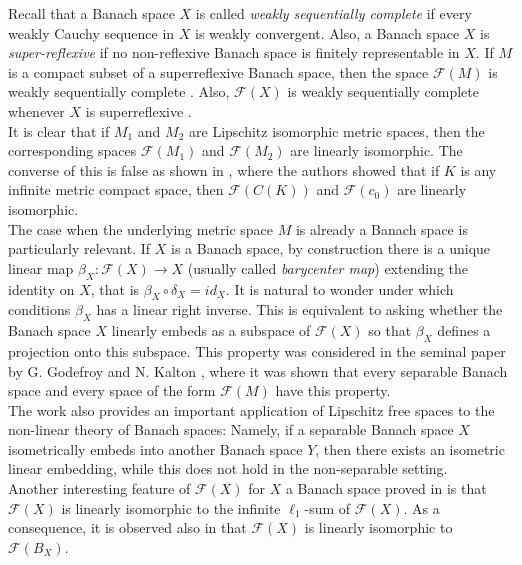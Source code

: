 \documentclass[12pt,leqno]{amsart}
\numberwithin{equation}{section} %
\theoremstyle{definition}
\numberwithin{equation}{section}
\begin{document}
Recall that a Banach space $X$ is called \textit{weakly sequentially complete} if every weakly Cauchy sequence in $X$ is weakly convergent. Also, a Banach space $X$ is \textit{super-reflexive} if no non-reflexive Banach space is finitely representable in $X$. If $M$ is a compact subset of a superreflexive Banach space, then the space $\mathcal F(M)$ is weakly sequentially complete \cite{KP}. Also, $\mathcal F(X)$ is weakly sequentially complete whenever $X$ is superreflexive \cite{APP21}. \\

It is clear that if $M_1$ and $M_2$ are Lipschitz isomorphic metric spaces, then the corresponding spaces $\mathcal F(M_1)$ and $\mathcal F(M_2)$ are linearly isomorphic. The converse of this is false as shown in \cite{DF}, where the authors showed that if $K$ is any infinite metric compact space, then $\mathcal F(C(K))$ and $\mathcal F(c_0)$ are linearly isomorphic.\\

The case when the underlying metric space $M$ is already a Banach space is particularly relevant. If $X$ is a Banach space, by construction there is a unique linear map $\beta_X:\mathcal F(X) \rightarrow X$ (usually called \emph{barycenter map}) extending the identity on $X$, that is $\beta_X \circ \delta_X=id_X$. It is natural to wonder under which conditions $\beta_X$ has a linear right inverse. This is equivalent to asking whether the Banach space $X$ linearly embeds as a subspace of $\mathcal F(X)$ so that $\beta_X$ defines a projection onto this subspace. This property was considered in the seminal paper by G. Godefroy and N. Kalton \cite{GK}, where it was shown that every separable Banach space and every space of the form $\mathcal F(M)$ have this property.\\

The work \cite{GK} also provides an important application of Lipschitz free spaces to the non-linear theory of Banach spaces: Namely, if a separable Banach space $X$ isometrically embeds into another Banach space $Y$, then there exists an isometric linear embedding, while this does
not hold in the non-separable setting.\\

Another interesting feature of $\mathcal F(X)$ for $X$ a Banach space proved in \cite{Kauf} is that $\mathcal F(X)$ is linearly isomorphic to the infinite $\ell_1$-sum of $\mathcal F(X)$. As a consequence, it is observed also in \cite{Kauf} that $\mathcal F(X)$ is linearly isomorphic to $\mathcal F(B_X)$.\\
\end{document}
